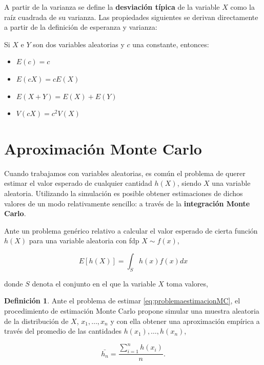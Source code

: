 \documentclass[
]{book}
\providecommand{\tightlist}{%
  \setlength{\itemsep}{0pt}\setlength{\parskip}{0pt}}
\newenvironment{yellowbox}{
  \definecolor{shadecolor}{rgb}{210, 180, 140}  
  \color{black}
  \begin{shaded}}
 {\end{shaded}}
\newenvironment{bluebox}{
  \definecolor{shadecolor}{rgb}{176, 196, 222}  
  \color{black}
  \begin{shaded}}
 {\end{shaded}}
\theoremstyle{definition}
\newtheorem{definition}{Definición}[chapter]
\theoremstyle{definition}
\theoremstyle{definition}
\theoremstyle{definition}
\theoremstyle{remark}
\begin{document}
A partir de la varianza se define la \textbf{desviación típica} de la variable \(X\) como la raíz cuadrada de su varianza. Las propiedades siguientes se derivan directamente a partir de la definición de esperanza y varianza:

\begin{bluebox}

Si \(X\) e \(Y\) son dos variables aleatorias y \(c\) una constante, entonces:

\begin{itemize}
\tightlist
\item
  \(E(c) = c\)
\item
  \(E(cX) = cE(X)\)
\item
  \(E(X+Y) = E(X) + E(Y)\)
\item
  \(V(cX) = c^2 V(X)\)
\end{itemize}

\end{bluebox}

\hypertarget{APMC}{%
\section{Aproximación Monte Carlo}\label{APMC}}

Cuando trabajamos con variables aleatorias, es común el problema de querer estimar el valor esperado de cualquier cantidad \(h(X)\), siendo \(X\) una variable aleatoria. Utilizando la simulación es posible obtener estimaciones de dichos valores de un modo relativamente sencillo: a través de la \textbf{integración Monte Carlo}.

Ante un problema genérico relativo a calcular el valor esperado de cierta función \(h(X)\) para una variable aleatoria con fdp \(X \sim f(x)\),

\begin{equation}
E[h(X)]=\int_S h(x) f(x) dx
\label{eq:problemaestimacionMC}
\end{equation}

donde \(S\) denota el conjunto en el que la variable \(X\) toma valores,

\begin{yellowbox}

\begin{definition}
\protect\hypertarget{def:MCestimacion}{}\label{def:MCestimacion}Ante el problema de estimar \eqref{eq:problemaestimacionMC}, el procedimiento de estimación Monte Carlo propone simular una muestra aleatoria de la distribución de \(X\), \(x_1,\ldots,x_n\) y con ella obtener una aproximación empírica a través del promedio de las cantidades \(h(x_1),\ldots,h(x_n)\),

\begin{equation}
\bar{h_n}=\frac{\sum_{i=1}^n h(x_i)}{n}.
\label{eq:estimacionMC}
\end{equation}
\end{definition}

\end{yellowbox}
\end{document}
